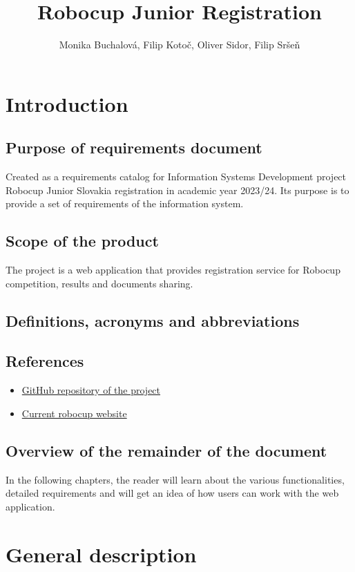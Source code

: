 \documentclass[a4paper]{article}
\title{Robocup Junior Registration}
\author{Monika Buchalová, Filip Kotoč, Oliver Sidor, Filip Sršeň}
\begin{document}
	\maketitle
	
	\tableofcontents
	\newpage
	\section{Introduction}
	\label{sec:Intro}
	\subsection{Purpose of requirements document}
	\label{sub:purpose}
	Created as a requirements catalog for Information Systems Development project Robocup Junior Slovakia registration in academic year 2023/24. Its purpose is to provide a set of requirements of the information system. 
	\subsection{Scope of the product}
	\label{sub:scope}
 	The project is a web application that provides registration service for Robocup competition, results and documents sharing. 
	\subsection{Definitions, acronyms and abbreviations}
	\label{sub:definitios}
	\subsection{References}
	\label{sub:references}
	\begin{itemize}
		\item 	\href{https://github.com/TIS2023-FMFI/robocup}{GitHub repository of the project }
		\item \href{https://www.skse.sk/}{Current robocup website}
	\end{itemize}
	\subsection{Overview of the remainder of the document}
	\label{sub:overview}
	In the following chapters, the reader will learn about the various functionalities, detailed requirements and will get an idea of how users can work with the web application.
	
	
	\newpage
	
	\section{General description}
	\label{sec:general-desc}
\end{document}
